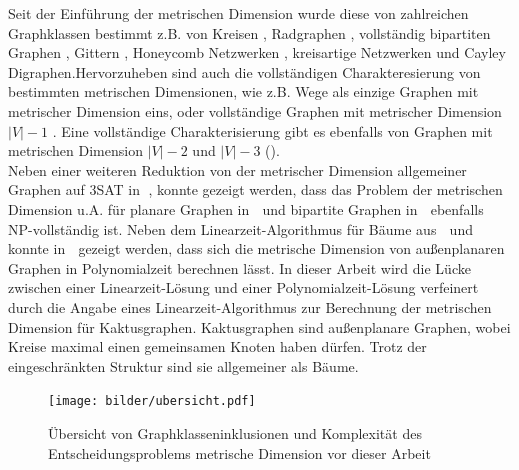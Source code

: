 Seit der Einführung der metrischen Dimension wurde diese von zahlreichen Graphklassen bestimmt z.B. von Kreisen \cite{landmarks}, Radgraphen \cite{wheel}, vollständig bipartiten Graphen \cite{upper}, Gittern \cite{landmarks}, Honeycomb Netzwerken \cite{honey}, kreisartige Netzwerken \cite{circulant} und Cayley Digraphen\cite{cayley}.\vspace{-1mm}\newline\newline Hervorzuheben sind auch die vollständigen Charakteresierung von bestimmten metrischen Dimensionen, wie z.B. Wege als einzige Graphen mit metrischer Dimension eins\cite{landmarks}, oder vollständige Graphen mit metrischer Dimension $|V|-1$ \cite{upper}. 
Eine vollständige Charakterisierung gibt es ebenfalls von Graphen mit metrischen Dimension $|V|-2$ \cite{upper} und $|V|-3$ (\cite{n-31,n-32}).\\
Neben einer weiteren Reduktion von der metrischer Dimension allgemeiner Graphen auf 3SAT in \grqq$\;$\cite{landmarks}, konnte gezeigt werden, dass das Problem der metrischen Dimension u.A. für planare Graphen in \grqq$\;$\cite{aussenplanar} und bipartite Graphen in \grqq$\;$\cite{bipartitnp} ebenfalls NP-vollständig ist. 
Neben dem Linearzeit-Algorithmus für Bäume aus \grqq$\;$\cite{harary} und \grqq$\;$\cite{landmarks} konnte in \grqq$\;$\cite{aussenplanar} gezeigt werden, dass sich die metrische Dimension von außenplanaren Graphen in Polynomialzeit berechnen lässt.\vspace{-1mm}\newline\newline
In dieser Arbeit wird die Lücke zwischen einer Linearzeit-Lösung und einer Polynomialzeit-Lösung verfeinert durch die Angabe eines Linearzeit-Algorithmus zur Berechnung der metrischen Dimension für Kaktusgraphen. Kaktusgraphen sind außenplanare Graphen, wobei Kreise maximal einen gemeinsamen Knoten haben dürfen. Trotz der eingeschränkten Struktur sind sie allgemeiner als Bäume.
\vspace{-3mm}
\newline
\begin{figure}[h]
\centering
\texttt{[image: bilder/ubersicht.pdf]}
\caption{Übersicht von Graphklasseninklusionen und Komplexität des Entscheidungsproblems metrische Dimension vor dieser Arbeit}
\end{figure}
